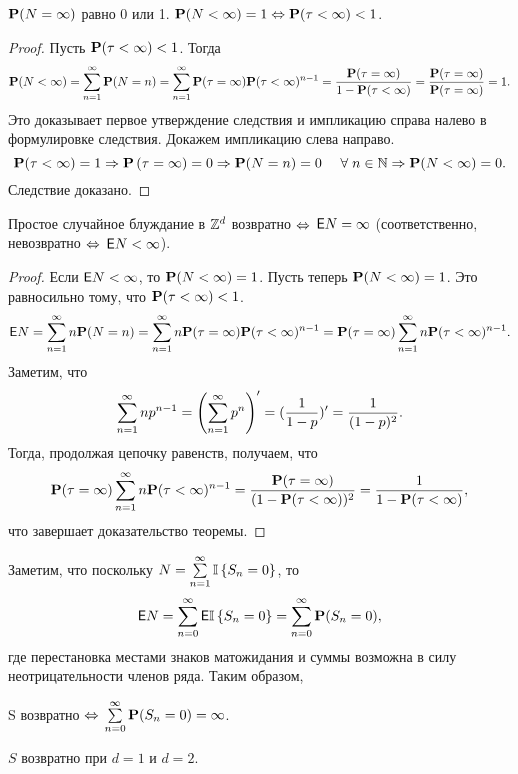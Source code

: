 \begin{imp}
	$\mathbf{P}(N = \infty)$ равно 0 или 1.
	$\mathbf{P}(N < \infty) = 1 \Leftrightarrow \mathbf{P}(\tau < \infty) < 1$.
\end{imp}

\begin{proof}
	Пусть $\mathbf{P}(\tau < \infty) < 1$.
	Тогда
	$$
		\mathbf{P}(N < \infty) = \sum\limits_{n=1}^{\infty} \mathbf{P}(N = n) = \sum\limits_{n=1}^{\infty} \mathbf{P}(\tau = \infty) \mathbf{P}(\tau < \infty)^{n-1}
		= \frac{\mathbf{P}(\tau = \infty)}{1 - \mathbf{P}(\tau < \infty)} = \frac{\mathbf{P}(\tau = \infty)}{\mathbf{P}(\tau = \infty)} = 1.
	$$
	Это доказывает первое утверждение следствия и импликацию справа налево в формулировке следствия.
	Докажем импликацию слева направо.
	$$
		\mathbf{P}(\tau < \infty) = 1 \Rightarrow \mathbf{P} \left(\tau = \infty \right) = 0 \Rightarrow \mathbf{P}(N = n) = 0
			\quad ~\forall\; n \in \mathbb{N} \Rightarrow \mathbf{P}(N < \infty) = 0.
	$$
	Следствие доказано.
\end{proof}

\begin{theorem}
	Простое случайное блуждание в $\mathbb{Z}^d$ возвратно $\Leftrightarrow$ $\mathsf{E} N = \infty$
	(соответственно, невозвратно $\Leftrightarrow$ $\mathsf{E} N < \infty$).
\end{theorem}

\begin{proof}
	Если $\mathsf{E} N < \infty$, то $\mathbf{P}(N<\infty) = 1$.
	Пусть теперь $\mathbf{P}(N<\infty) = 1$.
	Это равносильно тому, что $\mathbf{P}(\tau < \infty) < 1$.
	$$
		\mathsf{E} N = \sum\limits_{n=1}^{\infty} n\mathbf{P}(N=n)
	=	\sum\limits_{n=1}^{\infty} n\mathbf{P}(\tau = \infty)\mathbf{P}(\tau < \infty)^{n-1}
	=	\mathbf{P}(\tau = \infty)\sum\limits_{n=1}^{\infty} n\mathbf{P}(\tau < \infty)^{n-1}.
	$$
	Заметим, что
	$$
		\sum\limits_{n=1}^{\infty} np^{n-1} = \left(\sum\limits_{n=1}^{\infty} p^n\right)^{\prime} = (\frac1{1-p})^{\prime} = \frac1{(1-p)^2}.
	$$
	Тогда, продолжая цепочку равенств, получаем, что
	$$
		\mathbf{P}(\tau = \infty)\sum\limits_{n=1}^{\infty} n\mathbf{P}(\tau < \infty)^{n-1} =
		\frac{\mathbf{P}(\tau = \infty)}{(1 - \mathbf{P}(\tau < \infty))^2} = \frac1{1 - \mathbf{P}(\tau < \infty)},
	$$
	что завершает доказательство теоремы.
\end{proof}

\begin{note}
	Заметим, что поскольку $N = \sum\limits_{n=1}^{\infty} \mathbb{I} \left\{S_n = 0\right\}$, то
	$$
		\mathsf{E} N = \sum\limits_{n=0}^{\infty} \mathsf{E} \mathbb{I} \left\{S_n = 0\right\} = \sum\limits_{n=0}^{\infty} \mathbf{P}(S_n = 0),
	$$
	где перестановка местами знаков матожидания и суммы возможна в силу неотрицательности членов ряда.
	Таким образом,
	\begin{center}
		S возвратно $\Leftrightarrow$ $\sum\limits_{n=0}^{\infty} \mathbf{P}(S_n = 0) = \infty$.
	\end{center}
\end{note}

\begin{imp}
	$S$ возвратно при $d = 1$ и $d = 2$.
\end{imp}

